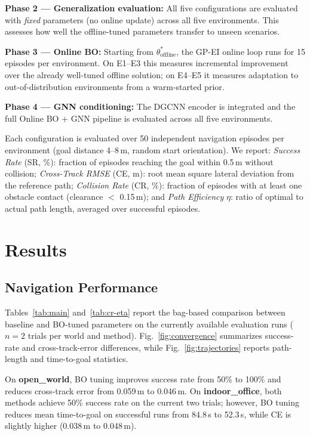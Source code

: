 \documentclass[conference]{IEEEtran}
\begin{document}
\textbf{Phase 2 — Generalization evaluation:} All five configurations are evaluated with \emph{fixed} parameters (no online update) across all five environments. This assesses how well the offline-tuned parameters transfer to unseen scenarios.

\textbf{Phase 3 — Online BO:} Starting from $\theta^*_{\text{offline}}$, the GP-EI online loop runs for 15 episodes per environment. On E1--E3 this measures incremental improvement over the already well-tuned offline solution; on E4--E5 it measures adaptation to out-of-distribution environments from a warm-started prior.

\textbf{Phase 4 — GNN conditioning:} The DGCNN encoder is integrated and the full Online BO + GNN pipeline is evaluated across all five environments.

Each configuration is evaluated over 50 independent navigation episodes per environment (goal distance 4--8\,m, random start orientation). We report: \textit{Success Rate} (SR, \%): fraction of episodes reaching the goal within 0.5\,m without collision; \textit{Cross-Track RMSE} (CE, m): root mean square lateral deviation from the reference path; \textit{Collision Rate} (CR, \%): fraction of episodes with at least one obstacle contact (clearance $<$ 0.15\,m); and \textit{Path Efficiency} $\eta$: ratio of optimal to actual path length, averaged over successful episodes.

\section{Results}
\label{sec:results}

\subsection{Navigation Performance}

Tables~\ref{tab:main} and~\ref{tab:cr-eta} report the bag-based comparison between baseline and BO-tuned parameters on the currently available evaluation runs ($n=2$ trials per world and method). Fig.~\ref{fig:convergence} summarizes success-rate and cross-track-error differences, while Fig.~\ref{fig:trajectories} reports path-length and time-to-goal statistics.

On \textbf{open\_world}, BO tuning improves success rate from 50\% to 100\% and reduces cross-track error from 0.059\,m to 0.046\,m. On \textbf{indoor\_office}, both methods achieve 50\% success rate on the current two trials; however, BO tuning reduces mean time-to-goal on successful runs from 84.8\,s to 52.3\,s, while CE is slightly higher (0.038\,m to 0.048\,m).
\end{document}
